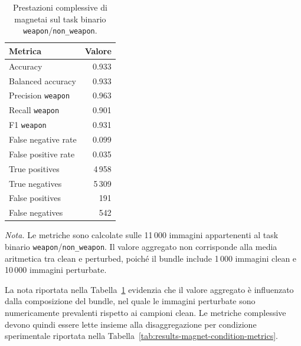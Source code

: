 \begin{table}[H]
\centering
\caption{Prestazioni complessive di \gls{magnetai} sul task binario \texttt{weapon}/\texttt{non\_weapon}.}
\label{tab:results-magnet-global-metrics}
\small
\begin{tabular}{lr}
\toprule
\textbf{Metrica} & \textbf{Valore} \\
\midrule
Accuracy & 0.933 \\
Balanced accuracy & 0.933 \\
Precision \texttt{weapon} & 0.963 \\
Recall \texttt{weapon} & 0.901 \\
F1 \texttt{weapon} & 0.931 \\
False negative rate & 0.099 \\
False positive rate & 0.035 \\
True positives & 4\,958 \\
True negatives & 5\,309 \\
False positives & 191 \\
False negatives & 542 \\
\bottomrule
\end{tabular}

\vspace{0.4em}
\footnotesize
\textit{Nota.} Le metriche sono calcolate sulle 11\,000 immagini appartenenti al
task binario \texttt{weapon}/\texttt{non\_weapon}. Il valore aggregato non
corrisponde alla media aritmetica tra clean e perturbed, poiché il bundle include
1\,000 immagini clean e 10\,000 immagini perturbate.
\end{table}

La nota riportata nella Tabella~\ref{tab:results-magnet-global-metrics}
evidenzia che il valore aggregato è influenzato dalla composizione del bundle,
nel quale le immagini perturbate sono numericamente prevalenti rispetto ai
campioni clean. Le metriche complessive devono quindi essere lette insieme alla
disaggregazione per condizione sperimentale riportata nella
Tabella~\ref{tab:results-magnet-condition-metrics}.

